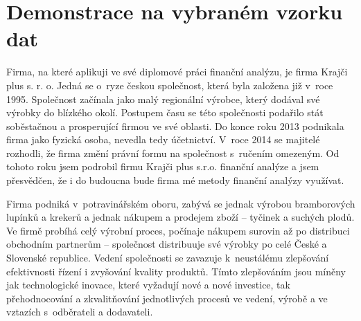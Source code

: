 \section{Demonstrace na vybraném vzorku dat}
Firma, na které aplikuji ve své diplomové práci finanční analýzu, je firma Krajči plus s. r. o. Jedná se o~ryze českou společnost, která byla založena již v~roce 1995. Společnost začínala
jako malý regionální výrobce, který dodával své výrobky do blízkého okolí. Postupem času se této společnosti podařilo stát soběstačnou a prosperující firmou ve své oblasti. Do konce roku 2013 podnikala firma jako fyzická osoba, nevedla tedy účetnictví. V~roce 2014 se majitelé rozhodli, že firma změní právní formu na společnost s~ručením omezeným. Od tohoto roku jsem podrobil firmu Krajči plus s.r.o. finanční analýze a jsem přesvědčen, že i do budoucna bude firma mé metody finanční analýzy využívat.

Firma podniká v~potravinářském oboru, zabývá se jednak výrobou bramborových lupínků a krekerů a jednak nákupem a prodejem zboží – tyčinek a suchých plodů. Ve firmě probíhá celý výrobní proces, počínaje nákupem surovin až po distribuci obchodním partnerům – společnost distribuuje své výrobky po celé České a Slovenské republice. Vedení společnosti se zavazuje k~neustálému zlepšování efektivnosti řízení i zvyšování kvality produktů. Tímto zlepšováním jsou míněny jak technologické inovace, které vyžadují nové a nové investice, tak přehodnocování a zkvalitňování jednotlivých procesů ve vedení, výrobě a ve vztazích s~odběrateli a dodavateli.

